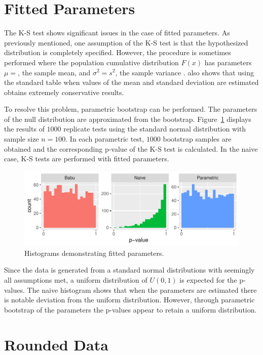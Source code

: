 \documentclass[12pt, letterpaper, titlepage]{article}
\makeatletter
\newcommand*{\Xbar}{}%
\DeclareRobustCommand*{\Xbar}{%
  \mathpalette\@Xbar{}%
}
\newcommand*{\@Xbar}[2]{%
  \sbox0{$#1\mathrm{X}\m@th$}%
  \sbox2{$#1X\m@th$}%
  \rlap{%
    \hbox to\wd2{%
      \hfill
      $\overline{%
        \vrule width 0pt height\ht0 %
        \kern\wd0 %
      }$%
    }%
  }%
  \copy2 %
}
\makeatother
\begin{document}
\hypertarget{sec:fitted}{%
\section{Fitted Parameters}\label{sec:fitted}}

The K-S test shows significant issues in the case of fitted parameters. As previously mentioned, one assumption of the K-S test is that the hypothesized distribution is completely specified. However, the procedure is sometimes performed where the population cumulative distribution $F(x)$ has parameters $\mu=\Xbar$, the sample mean, and $\sigma^2=s^2$, the sample variance \citep{Lilliefors}. \citet{Lilliefors} also shows that using the standard table when values of the mean and standard deviation are estimated obtains extremely conservative results. 

To resolve this problem, parametric bootstrap can be performed. The parameters of the null distribution are approximated from the bootstrap. Figure~\ref{fig:hist_fitted} displays the results of $1000$ replicate tests using the standard normal distribution with sample size $n=100$. In each parametric test, $1000$ bootstrap samples are obtained and the corresponding p-value of the K-S test is calculated. In the naive case, K-S tests are performed with fitted parameters.

\begin{figure}[tbp]
  \centering
  \includegraphics{hist_fitted}
  \caption{Histograms demonstrating fitted parameters.}
  \label{fig:hist_fitted}
\end{figure}

Since the data is generated from a standard normal distributions with seemingly all assumptions met, a uniform distribution of $U(0,1)$ is expected for the p-values. The naive histogram shows that when the parameters are estimated there is notable deviation from the uniform distribution. However, through parametric bootstrap of the parameters the p-values appear to retain a uniform distribution.

\hypertarget{sec:rounded}{%
\section{Rounded Data}\label{sec:rounded}}
\end{document}
